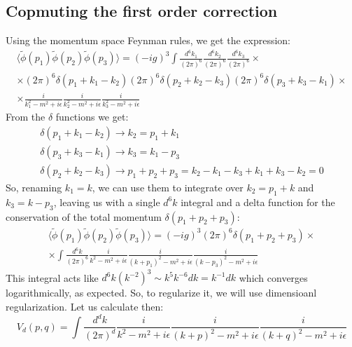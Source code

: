 \documentclass{article}
\begin{document}
\subsection{Copmuting the first order correction}
Using the momentum space Feynman rules, we get the expression:
\begin{equation}
\begin{gathered}
    \langle \tilde{\phi}(p_1) \tilde{\phi}(p_2) \tilde{\phi}(p_3) \rangle =
    (-ig)^3 \int \frac{d^6k_1}{(2\pi)^6} \frac{d^6k_2}{(2\pi)^6} \frac{d^6k_3}{(2\pi)^6} \times \\ \times
    (2\pi)^6\delta(p_1 + k_1 - k_2)(2\pi)^6\delta(p_2 + k_2 - k_3)(2\pi)^6\delta(p_3 + k_3 - k_1) \times \\ \times
    \frac{i}{k_1^2 - m^2 + i\epsilon}\frac{i}{k_2^2 - m^2 + i\epsilon}\frac{i}{k_3^2 - m^2 + i\epsilon}
\end{gathered}
\end{equation}
From the $\delta$ functions we get:
\begin{equation}
\begin{gathered}
    \delta(p_1 + k_1 - k_2) \rightarrow k_2 = p_1 + k_1 \\
    \delta(p_3 + k_3 - k_1) \rightarrow k_3 = k_1 - p_3 \\
    \delta(p_2 + k_2 - k_3) \rightarrow p_1 + p_2 + p_3 = k_2 - k_1 - k_3 + k_1 + k_3 - k_2 = 0
\end{gathered}
\end{equation}
So, renaming $k_1 = k$, we can use them to integrate over $k_2 = p_1 + k$ and $k_3 = k - p_3$, leaving us with a single $d^6k$ integral and a delta function for the conservation of the total momentum $\delta(p_1 + p_2 + p_3)$:
\begin{equation}
\begin{gathered}
    \langle \tilde{\phi}(p_1) \tilde{\phi}(p_2) \tilde{\phi}(p_3) \rangle =
    (-ig)^3 (2\pi)^6\delta \left(p_1 + p_2 + p_3\right) \times \\ \times
    \int \frac{d^6k}{(2\pi)^6}
    \frac{i}{k^2 - m^2 + i\epsilon}\frac{i}{(k + p_1)^2 - m^2 + i\epsilon}\frac{i}{(k - p_3)^2 - m^2 + i\epsilon}
\end{gathered}
\end{equation}
This integral acts like $d^6k \left(k^{-2}\right)^3 \sim k^5k^{-6}dk = k^{-1}dk$ which converges logarithmically, as expected. So, to regularize it, we will use dimensioanl regularization. Let us calculate then:
\begin{equation}
    V_d(p, q) = \int \frac{d^dk}{(2\pi)^d}
    \frac{i}{k^2 - m^2 + i\epsilon}\frac{i}{(k + p)^2 - m^2 + i\epsilon}\frac{i}{(k + q)^2 - m^2 + i\epsilon}
\end{equation}
\end{document}
